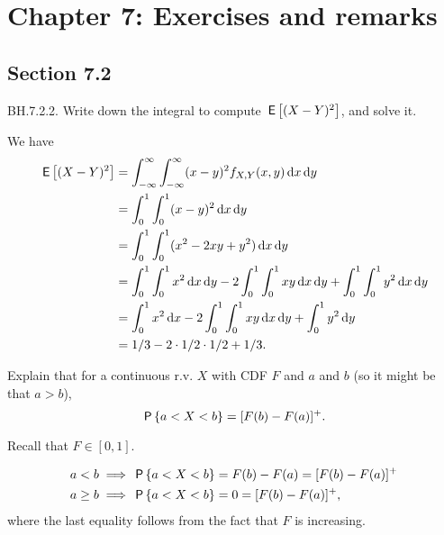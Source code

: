 




\chapter{Chapter 7: Exercises and remarks}
\label{cha:questions-chapter-7}





\section{Section 7.2}
\label{sec:section-7.2}


\begin{exercise}
BH.7.2.2. Write down the integral to compute $\E{(X-Y)^{2}}$, and solve it.
\begin{solution}
We have
\begin{align}
    \E{(X-Y)^2} &= \int_{-\infty}^\infty \int_{-\infty}^\infty (x - y)^2 f_{X,Y}(x,y) \d x \d y \\
    &=\int_0^1 \int_0^1 (x - y)^2 \d x \d y \\
    &=\int_0^1 \int_0^1 (x^{2} - 2 x y +  y^2) \d x \d y \\
    &=\int_0^1 \int_0^1 x^{2} \d x \d y
    -2\int_0^1 \int_0^1  x y  \d x \d y
    +\int_0^1 \int_0^1  y^2 \d x \d y  \\
    &=\int_0^1 x^{2} \d x
    -2\int_0^1 \int_0^1 x y  \d x \d y
    + \int_0^1  y^2  \d y \\
    &=1/3  -2 \cdot 1/ 2 \cdot 1/ 2 + 1/3.
\end{align}
\end{solution}
\end{exercise}


\begin{exercise}
Explain that for a continuous r.v. $X$ with CDF $F$ and $a$ and $b$ (so it might be that $a>b$),
\begin{equation}
  \label{eq:87}
\P{a< X < b} = [F(b) - F(a)]^{+}.
\end{equation}
\begin{hint}
  Recall that $F\in [0, 1]$.
\end{hint}
\begin{solution}
\begin{align}
a<b & \implies \P{a< X < b} = F(b) - F(a) = [F(b) - F(a)]^{+} \\
a\geq b & \implies \P{a< X < b} =  0 = [F(b) - F(a)]^{+},
\end{align}
where the last equality follows from the fact that $F$ is increasing.
\end{solution}
\end{exercise}

